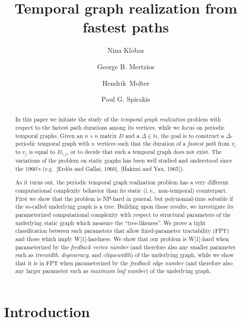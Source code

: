 \documentclass[a4paper,UKenglish,cleveref, autoref, thm-restate]{lipics-v2021}
\title{Temporal graph realization from fastest paths} %
\author{Nina Klobas}{Department of Computer Science, Durham University, UK}{nina.klobas@durham.ac.uk}{ https://orcid.org/0000-0002-8024-5782}{}
\author{George B. Mertzios}{Department of Computer Science, Durham University, UK}{george.mertzios@durham.ac.uk}{https://orcid.org/0000-0001-7182-585X}{Supported by the EPSRC grant EP/P020372/1.}
\author{Hendrik~Molter}{Department of Computer Science, Ben-Gurion~University~of~the~Negev, 
Beer-Sheva, 
Israel}{molterh@post.bgu.ac.il}{https://orcid.org/0000-0002-4590-798X}{Supported by the ISF, grant No.~1456/18, and the ERC, grant number 949707.}
\author{Paul G. Spirakis}{Department of Computer Science, University of Liverpool, UK}{p.spirakis@liverpool.ac.uk}{https://orcid.org/0000-0001-5396-3749}{Supported by the EPSRC grant EP/P02002X/1.}
\newcommand{\ie}{i.\,e.,\ }
\begin{document}
\maketitle

\begin{abstract}
In this paper we initiate the study of the \emph{temporal graph realization} problem with respect to the fastest path durations among its vertices, 
while we focus on periodic temporal graphs. 
Given an $n \times n$ matrix $D$ and a $\Delta \in \mathbb{N}$, the goal is to construct a $\Delta$-periodic temporal graph with $n$ vertices 
such that the duration of a \emph{fastest path} from $v_i$ to $v_j$ is equal to $D_{i,j}$, or to decide that such a temporal graph does not exist. 
The variations of the problem on static graphs has been well studied and understood since the 1960's (e.g.\ [Erd\H{o}s and Gallai, 1960], [Hakimi and Yau, 1965]).

As it turns out, the periodic temporal graph realization problem has a very different computational complexity behavior than its static (\ie non-temporal) counterpart. 
First we show that the problem is NP-hard in general, but polynomial-time solvable if the so-called underlying graph is a tree.
Building upon those results, we investigate its parameterized computational complexity with respect to structural parameters of the underlying static graph which measure the ``tree-likeness''. We prove a tight classification between such parameters that allow fixed-parameter tractability (FPT) 
and those which imply W[1]-hardness. 
We show that our problem is W[1]-hard when parameterized by the \emph{feedback vertex number} (and therefore also any smaller parameter such as \emph{treewidth}, \emph{degeneracy}, and \emph{cliquewidth}) of the underlying graph, while we show that it is in FPT when parameterized by the \emph{feedback edge number} (and therefore also any larger parameter such as \emph{maximum leaf number}) of the underlying graph.  





\end{abstract}



\section{Introduction}\label{intro-sec}
\end{document}
